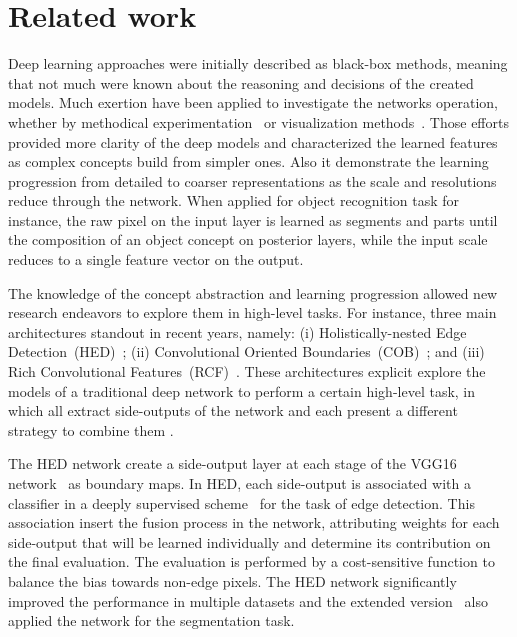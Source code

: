 \section{Related work}
\label{sec:related}




Deep learning approaches were initially described as black-box methods, meaning that not much were known about the reasoning and decisions of the created models. Much exertion have been applied to investigate the networks operation, whether by methodical experimentation~\cite{ilin17,kuo16,eigen14,zhang17} or visualization methods~\cite{simonyan13,zeiler14}. Those efforts provided more clarity of the deep models and characterized the learned features as complex concepts build from simpler ones. Also it demonstrate the learning progression from detailed to coarser representations as the scale and resolutions reduce through the network.  When applied for object recognition task for instance, the raw pixel on the input layer is learned as segments and parts until the composition of an object concept on posterior layers, while the input scale reduces to a single feature vector on the output.  

The knowledge of the concept abstraction and learning progression allowed new research endeavors to explore  them in high-level tasks. For instance, three main architectures standout in recent years, namely: (i) Holistically-nested Edge Detection~(HED)~\cite{xie2015}; (ii) Convolutional Oriented Boundaries~(COB)~\cite{maninis2017}; and (iii) Rich Convolutional Features~(RCF)~\cite{liu2017}. These architectures explicit explore the models of a traditional deep network to perform a certain high-level task, in which all extract side-outputs of the network and each present a different strategy to combine them . 

The HED network create a side-output layer at each stage of the VGG16 network~\cite{simonyan2014} as boundary maps. In HED, each side-output is associated with a classifier in a deeply supervised scheme~\cite{lee2015} for the task of edge detection. This association insert the fusion process in the network, attributing weights for each side-output that will be learned individually and determine its contribution on the final evaluation. The evaluation is performed by a cost-sensitive function to balance the bias towards non-edge pixels. The HED network significantly improved the performance in multiple datasets and the extended version~\cite{xie2017} also applied the network for the segmentation task. 

